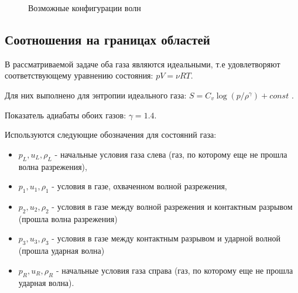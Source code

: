 \documentclass[a4paper,12pt]{extarticle}
\begin{document}
\begin{figure}[h]
\begin{minipage}[h]{0.32\linewidth}
\end{minipage}
\hfill
\begin{minipage}[h]{0.32\linewidth}
\end{minipage}
\caption{Возможные конфигурации волн}
\label{fig:Sod 2 moments}
\end{figure}

\subsection{Соотношения на границах областей} \label{sec: relations bound}
В рассматриваемой задаче оба газа являются идеальными, т.е удовлетворяют соответствующему уравнению состояния: $ pV = \nu RT$.

Для них выполнено  для энтропии идеального газа: $S = C_v\log(p/\rho^\gamma)+const$ .

Показатель адиабаты обоих газов: $\gamma = 1.4$.

Используются следующие обозначения для состояний газа:
\begin{itemize}
    \item $p_L, u_L, \rho_L$ - начальные условия газа слева (газ, по которому еще не прошла волна разрежения),
    \item $p_1, u_1, \rho_1$ - условия в газе, охваченном волной разрежения,
    \item $p_2, u_2, \rho_2$ - условия в газе между волной разрежения и контактным разрывом (прошла волна разрежения)
    \item $p_3, u_3, \rho_3$ - условия в газе между контактным разрывом и ударной волной (прошла ударная волна)
    \item $p_R, u_R, \rho_R$ - начальные условия газа справа (газ, по которому еще не прошла ударная волна).
\end{itemize}
\end{document}
